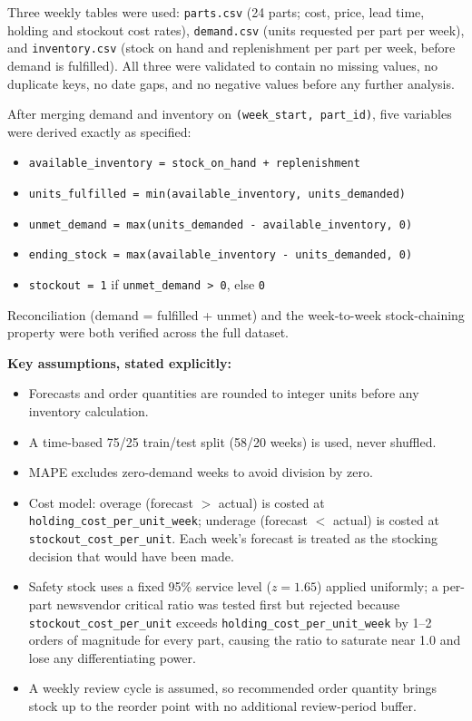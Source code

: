 \documentclass[12pt]{article}
\begin{document}
Three weekly tables were used: \texttt{parts.csv} (24 parts; cost, price, lead time, holding
and stockout cost rates), \texttt{demand.csv} (units requested per part per week), and
\texttt{inventory.csv} (stock on hand and replenishment per part per week, before demand is
fulfilled). All three were validated to contain no missing values, no duplicate keys, no date
gaps, and no negative values before any further analysis.

After merging demand and inventory on \texttt{(week\_start, part\_id)}, five variables were
derived exactly as specified:
\begin{itemize}[nosep]
  \item \texttt{available\_inventory = stock\_on\_hand + replenishment}
  \item \texttt{units\_fulfilled = min(available\_inventory, units\_demanded)}
  \item \texttt{unmet\_demand = max(units\_demanded - available\_inventory, 0)}
  \item \texttt{ending\_stock = max(available\_inventory - units\_demanded, 0)}
  \item \texttt{stockout = 1} if \texttt{unmet\_demand > 0}, else \texttt{0}
\end{itemize}
Reconciliation (demand = fulfilled + unmet) and the week-to-week stock-chaining property were
both verified across the full dataset.

\textbf{Key assumptions, stated explicitly:}
\begin{itemize}[nosep]
  \item Forecasts and order quantities are rounded to integer units before any inventory
  calculation.
  \item A time-based 75/25 train/test split (58/20 weeks) is used, never shuffled.
  \item MAPE excludes zero-demand weeks to avoid division by zero.
  \item Cost model: overage (forecast $>$ actual) is costed at
  \texttt{holding\_cost\_per\_unit\_week}; underage (forecast $<$ actual) is costed at
  \texttt{stockout\_cost\_per\_unit}. Each week's forecast is treated as the stocking
  decision that would have been made.
  \item Safety stock uses a fixed 95\% service level ($z = 1.65$) applied uniformly; a
  per-part newsvendor critical ratio was tested first but rejected because
  \texttt{stockout\_cost\_per\_unit} exceeds \texttt{holding\_cost\_per\_unit\_week} by 1--2
  orders of magnitude for every part, causing the ratio to saturate near 1.0 and lose any
  differentiating power.
  \item A weekly review cycle is assumed, so recommended order quantity brings stock up to
  the reorder point with no additional review-period buffer.
\end{itemize}
\end{document}
